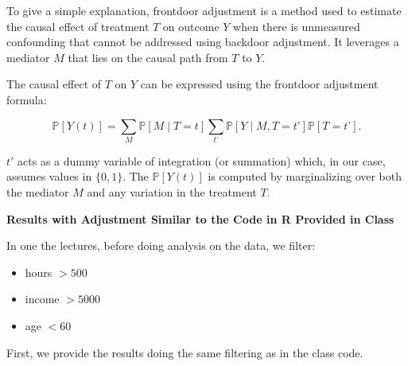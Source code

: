 \documentclass{article}
\begin{document}
To give a simple explanation, frontdoor adjustment is a method used to estimate the causal effect of treatment $T$ on outcome $Y$ when there is unmeasured confounding that cannot be addressed using backdoor adjustment. It leverages a mediator $M$ that lies on the causal path from $T$ to $Y$.

The causal effect of $T$ on $Y$ can be expressed using the frontdoor adjustment formula:

\begin{equation}
\mathbb{P}[Y(t)] = \sum_M \mathbb{P}[M \mid T=t] \sum_{t’} \mathbb{P}[Y \mid M, T=t’] \mathbb{P}[T=t’].
\end{equation}

$t'$ acts as a dummy variable of integration (or summation) which, in our case, assumes values in $\{0, 1\}$. The $\mathbb{P}[Y(t)]$ is computed by marginalizing over both the mediator $M$ and any variation in the treatment $T$.

\textbf{Results with Adjustment Similar to the Code in R Provided in Class}

In one the lectures, before doing analysis on the data, we filter:
\begin{itemize}
  \item hours $> 500$
  \item income $> 5000$
  \item age $< 60$
\end{itemize}

First, we provide the results doing the same filtering as in the class code.
\end{document}
